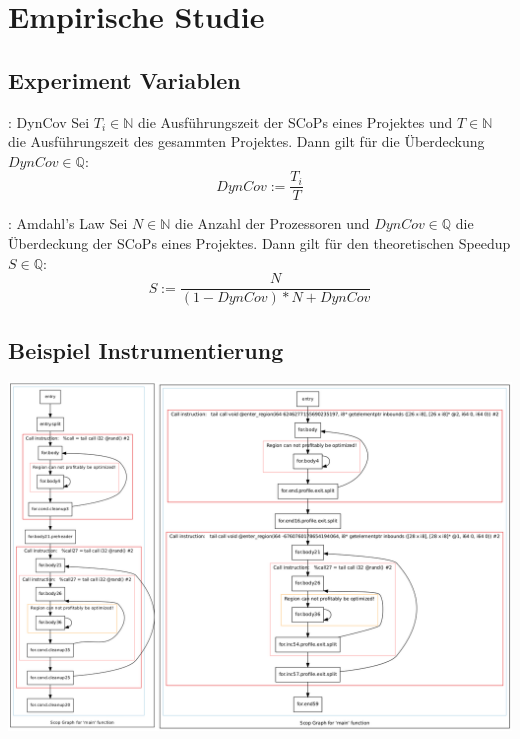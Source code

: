 \documentclass[aspectratio=169, xcolor=dvipsnames]{beamer}
\begin{document}
\section{Empirische Studie}
\subsection{Experiment Variablen}
\begin{frame}{\subsecname: DynCov}
    Sei \(T_i\in\mathbb{N}\) die Ausführungszeit der SCoPs eines Projektes und \(T\in\mathbb{N}\) die Ausführungszeit des gesammten Projektes. Dann gilt für die Überdeckung \(DynCov\in\mathbb{Q}\):
    \Huge{\[DynCov := \frac{T_i}{T}\]}
\end{frame}
\begin{frame}{\subsecname: Amdahl's Law}
    Sei \(N\in\mathbb{N}\) die Anzahl der Prozessoren und \(DynCov\in\mathbb{Q}\) die Überdeckung der SCoPs eines Projektes. Dann gilt für den theoretischen Speedup \(S\in\mathbb{Q}\):
    \Huge{\[S := \frac{N}{(1-DynCov)*N+DynCov}\]}
\end{frame}
\subsection{Beispiel Instrumentierung}
\begin{frame}{\subsecname}
    \centering
    \includegraphics[height=\textheight]{gfx/matmulScopsAfterInstrumentation.png}
\end{frame}
\end{document}
